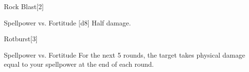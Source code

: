\begin{spellsection}{Rock Blast}[2]
    \begin{spellheader}
    \end{spellheader}
    \begin{spellcontent}
        \begin{spelltargetinginfo}
        \end{spelltargetinginfo}
        \begin{spelleffects}
            \begin{spellattack}{Spellpower vs. Fortitude}
                \spellsuccess {}[d8]
                \spellfailure Half damage.
            \end{spellattack}
        \end{spelleffects}
    \end{spellcontent}
    \begin{spellfooter}
        \spellnotes \destructivespellnotes
        \miscastexplode
    \end{spellfooter}
\end{spellsection}

\begin{spellsection}{Rotburst}[3]
    \begin{spellheader}
    \end{spellheader}
    \begin{spellcontent}
        \begin{spelltargetinginfo}
        \end{spelltargetinginfo}
        \begin{spelleffects}
            \begin{spellattack}{Spellpower vs. Fortitude}
                \spellsuccess For the next 5 rounds, the target takes physical damage equal to your spellpower at the end of each round.
            \end{spellattack}
        \end{spelleffects}
    \end{spellcontent}
    \begin{spellfooter}
        \miscastexplode
    \end{spellfooter}
\end{spellsection}

